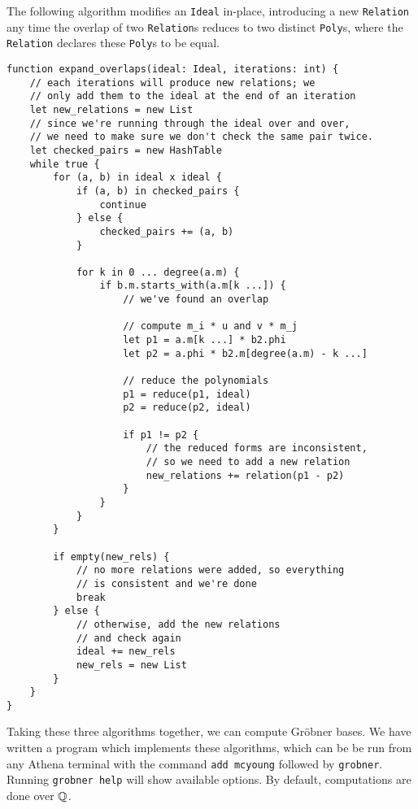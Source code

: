 \begin{alg}
    The following algorithm modifies an \verb|Ideal| in-place, introducing a new
    \verb|Relation| any time the overlap of two \verb|Relation|s reduces to two
    distinct \verb|Poly|s, where the \verb|Relation| declares these \verb|Poly|s to
    be equal.
\begin{verbatim}
function expand_overlaps(ideal: Ideal, iterations: int) {
    // each iterations will produce new relations; we 
    // only add them to the ideal at the end of an iteration
    let new_relations = new List
    // since we're running through the ideal over and over,
    // we need to make sure we don't check the same pair twice.
    let checked_pairs = new HashTable
    while true {
        for (a, b) in ideal x ideal {
            if (a, b) in checked_pairs {
                continue
            } else {
                checked_pairs += (a, b)
            }
            
            for k in 0 ... degree(a.m) {
                if b.m.starts_with(a.m[k ...]) {
                    // we've found an overlap
                    
                    // compute m_i * u and v * m_j
                    let p1 = a.m[k ...] * b2.phi
                    let p2 = a.phi * b2.m[degree(a.m) - k ...]
                    
                    // reduce the polynomials
                    p1 = reduce(p1, ideal)
                    p2 = reduce(p2, ideal)
                    
                    if p1 != p2 {
                        // the reduced forms are inconsistent, 
                        // so we need to add a new relation
                        new_relations += relation(p1 - p2)
                    }
                }
            }
        }
        
        if empty(new_rels) {
            // no more relations were added, so everything
            // is consistent and we're done
            break
        } else {
            // otherwise, add the new relations
            // and check again
            ideal += new_rels
            new_rels = new List
        }
    }
}
\end{verbatim}
\end{alg}

Taking these three algorithms together, we can compute Gr\"obner bases. We have written
a program which implements these algorithms, which can be be run from any Athena
terminal with the command \verb|add mcyoung| followed by \verb|grobner|. Running
\verb|grobner help| will show available options. By default, computations are done
over $\mathbb{Q}$.

